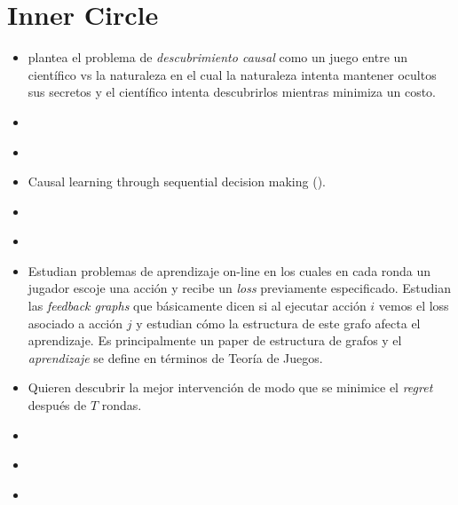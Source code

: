 \documentclass[11pt]{article}
\theoremstyle{plain}
\begin{document}
\section{Inner Circle}
\begin{itemize}
\item \cite{eberhardt2008causal} plantea el problema de \textit{descubrimiento causal} como un juego entre un científico vs la naturaleza en el cual la naturaleza intenta mantener ocultos sus secretos y el científico intenta descubrirlos mientras minimiza un costo. 
\item \cite{eberhardt2012number}
\item \cite{hauser2012two}
\item Causal learning through sequential decision making (\cite{hagmayer2013repeated}).
\item \cite{ortega2014generalized} 
\item \cite{bramley2015staying}
\item \cite{alon2015online} Estudian problemas de aprendizaje on-line en los cuales en cada ronda un jugador escoje una acción y recibe un \textit{loss} previamente especificado. Estudian las \textit{feedback graphs} que básicamente dicen si al ejecutar acción $i$ vemos el loss asociado a acción $j$ y estudian cómo la estructura de este grafo afecta el aprendizaje. Es principalmente un paper de estructura de grafos y el \textit{aprendizaje} se define en términos de Teoría de Juegos.
\item \cite{lattimoreNIPS2016} Quieren descubrir la mejor intervención de modo que se minimice el \textit{regret} después de $T$ rondas.
\item \cite{albrecht2016exploiting}
\item \cite{garnelo2016towards}
\item \cite{innes2018reasoning}
\end{itemize}
\newpage


\end{document}
